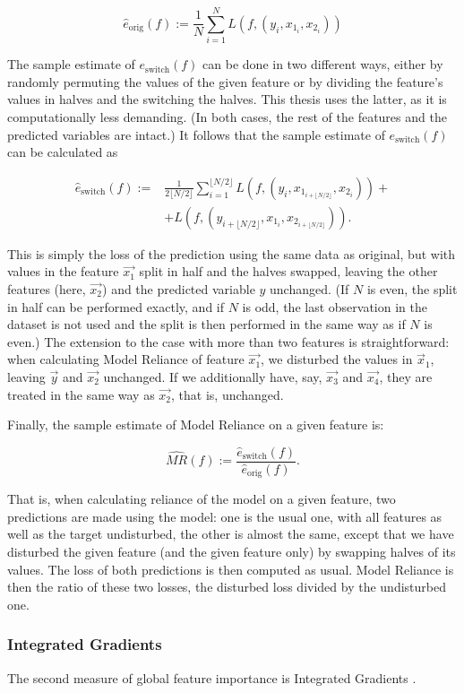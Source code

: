 		\begin{equation}
			\hat{e}_{\text{orig}}(f):= \frac{1}{N} \sum_{i=1}^{N} L\left(f, (y_i, x_{1_i}, x_{2_i}) \right)
		\end{equation} 
		
		The sample estimate of $e_{\text{switch}}(f)$ can be done in two different ways, either by randomly permuting the values of the given feature or by dividing the feature's values in halves and the switching the halves. This thesis uses the latter, as it is computationally less demanding. (In both cases, the rest of the features and the predicted variables are intact.) It follows that the sample estimate of $e_{\text{switch}}(f)$ can be calculated as
		
		
		\begin{equation}
			\begin{split}
				\hat{e}_{\text{switch}}(f):= & \frac{1}{2 \lfloor N/2 \rfloor} \sum_{i=1}^{\lfloor N/2 \rfloor} L \left(f, \left( y_i, x_{1_{i+\lfloor N/2 \rfloor}}, x_{2_{i}} \right) \right) + \\ 
				& + L \left( f, \left(y_{i+\lfloor N/2 \rfloor}, x_{1_{i}}, x_{2_{i+\lfloor N/2 \rfloor}} \right) \right). 
			\end{split}
		\end{equation}
		
		This is simply the loss of the prediction using the same data as original, but with values in the feature $\vec{x_1}$ split in half and the halves swapped, leaving the other features (here, $\vec{x_2}$) and the predicted variable $y$ unchanged. (If $N$ is even, the split in half can be performed exactly, and if $N$ is odd, the last observation in the dataset is not used and the split is then performed in the same way as if $N$ is even.) The extension to the case with more than two features is straightforward: when calculating Model Reliance of feature $\vec{x_1}$, we disturbed the values in $\vec{x}_1$, leaving $\vec{y}$ and $\vec{x_2}$ unchanged. If we additionally have, say, $\vec{x_3}$ and $\vec{x_4}$, they are treated in the same way as $\vec{x_2}$, that is, unchanged. 
		
		Finally, the sample estimate of Model Reliance on a given feature is: 
		
		\begin{equation}
			\widehat{MR}(f):=\frac{\hat{e}_{\text{switch}}(f)}{\hat{e}_{\text{orig}}(f)}.
		\end{equation}
			
		That is, when calculating reliance of the model on a given feature, two predictions are made using the model: one is the usual one, with all features as well as the target undisturbed, the other is almost the same, except that we have disturbed the given feature (and the given feature only) by swapping halves of its values. The loss of both predictions is then computed as usual. Model Reliance is then the ratio of these two losses, the disturbed loss divided by the undisturbed one.   
		
		
	
		
	\subsubsection{Integrated Gradients}
		The second measure of global feature importance is Integrated Gradients \citep{sundararajan2017axiomatic}. 


